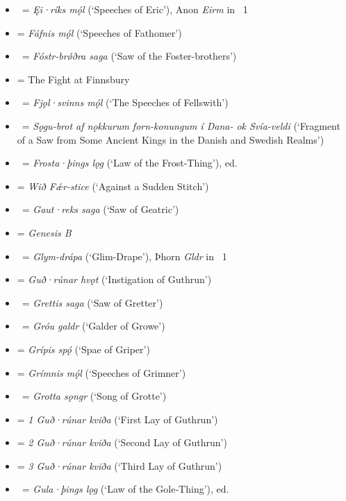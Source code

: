 \begin{itemize}
	\item \Eiriksmal\ = \emph{Ęi·ríks mǫ́l} (‘Speeches of Eric’), Anon \emph{Eirm} in \Skp\ 1
	\item \textbf{} = \emph{Fáfnis mǫ́l} (‘Speeches of Fathomer’)
	\item \FostrbroedhraSaga\ = \emph{Fóstr-brǿðra saga} (‘Saw of the Foster-brothers’)
	\item \textbf{} = The Fight at Finnsbury
	\item \Fjolsvinnsmal\ = \emph{Fjǫl·svinns mǫ́l} (‘The Speeches of Fellswith’)
	\item \Sogubrot\ = \emph{Sǫgu-brot af nǫkkurum forn-konungum í Dana- ok Svía-veldi} (‘Fragment of a Saw from Some Ancient Kings in the Danish and Swedish Realms’)
	\item \Frostatingslog\ = \emph{Frosta·þings lǫg} (‘Law of the Frost‑Thing’), ed. 
	\item \textbf{} = \emph{Wið Fǽr-stice} (‘Against a Sudden Stitch’)
	\item \GautreksSaga\ = \emph{Gaut·reks saga} (‘Saw of Geatric’)
	\item \textbf{} = \emph{Genesis B}
	\item \Glymdrapa\ = \emph{Glym-drápa} (‘Glim-Drape’), Þhorn \emph{Gldr} in \Skp\ 1
	\item \textbf{} = \emph{Guð·rúnar hvǫt} (‘Instigation of Guthrun’)
	\item \Grettissaga\ = \emph{Grettis saga} (‘Saw of Gretter’)
	\item \Grougaldr\ = \emph{Gróu galdr} (‘Galder of Growe’)
	\item \textbf{} = \emph{Grípis spǫ́} (‘Spae of Griper’)
	\item \textbf{} = \emph{Grímnis mǫ́l} (‘Speeches of Grimner’)
	\item \Grottasongr\ = \emph{Grotta sǫngr} (‘Song of Grotte’)
	\item \textbf{} = \emph{1 Guð·rúnar kviða} (‘First Lay of Guthrun’)
	\item \textbf{} = \emph{2 Guð·rúnar kviða} (‘Second Lay of Guthrun’)
	\item \textbf{} = \emph{3 Guð·rúnar kviða} (‘Third Lay of Guthrun’)
	\item \Gulatingslog\ = \emph{Gula·þings lǫg} (‘Law of the Gole‑Thing’), ed. 

\end{itemize}
